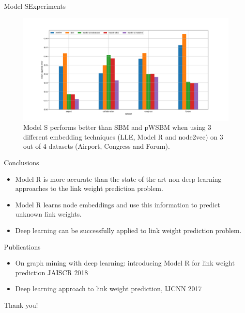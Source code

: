 \documentclass{beamer}
\begin{document}
\begin{frame}{Model S}{Experiments}
	\begin{figure}[ht] \centering
		\includegraphics[width=1\linewidth]{weight-errors}
		\caption{
			Model S performs better than SBM and pWSBM when using 3 different embedding techniques (LLE, Model R and node2vec) on 3 out of 4 datasets (Airport, Congress and Forum).
		}
		\label{fig:weight-errors}
	\end{figure}
\end{frame}

\begin{frame}{Conclusions}
	\begin{itemize}
		\item Model R is more accurate than the state-of-the-art non deep learning approaches to the link weight prediction problem.
		\item Model R learns node embeddings and use this information to predict unknown link weights.
		\item Deep learning can be successfully applied to link weight prediction problem.
	\end{itemize}
\end{frame}

\begin{frame}{Publications}
	\begin{itemize}
		\item On graph mining with deep learning: introducing Model R for link weight prediction JAISCR 2018
		\item Deep learning approach to link weight prediction, IJCNN 2017
	\end{itemize}
\end{frame}

\begin{frame}
	\begin{center}
		\Huge Thank you!
	\end{center}
\end{frame}
\end{document}

